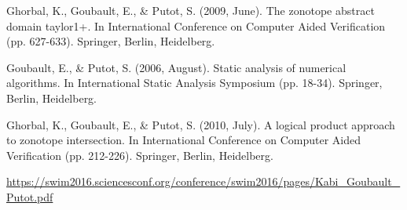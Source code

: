 \documentclass[a4paper]{article}
\begin{document}
\begin{thebibliography}{9}

Ghorbal, K., Goubault, E., \& Putot, S. (2009, June). The zonotope abstract domain taylor1+. In International Conference on Computer Aided Verification (pp. 627-633). Springer, Berlin, Heidelberg.

Goubault, E., \& Putot, S. (2006, August). Static analysis of numerical algorithms. In International Static Analysis Symposium (pp. 18-34). Springer, Berlin, Heidelberg.

Ghorbal, K., Goubault, E., \& Putot, S. (2010, July). A logical product approach to zonotope intersection. In International Conference on Computer Aided Verification (pp. 212-226). Springer, Berlin, Heidelberg.

\url{https://swim2016.sciencesconf.org/conference/swim2016/pages/Kabi_Goubault_Putot.pdf}

\end{thebibliography}
\end{document}
